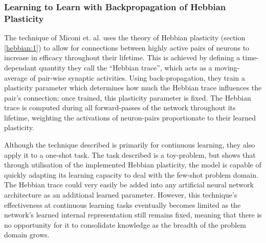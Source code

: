 \documentclass{report}
\begin{document}
	\subsubsection{Learning to Learn with Backpropagation of Hebbian Plasticity}
	The technique of Miconi et. al. \parencite{ltlwbohb} uses the theory of Hebbian plasticity (section \ref{hebbian:1}) to allow for connections between highly active pairs of neurons to increase in efficacy throughout their lifetime. This is achieved by defining a time-dependant quantity they call the ``Hebbian trace'', which acts as a moving-average of pair-wise synaptic activities. Using back-propagation, they train a plasticity parameter which determines how much the Hebbian trace influences the pair's connection; once trained, this plasticity parameter is fixed. The Hebbian trace is computed during all forward-passes of the network throughout its lifetime, weighting the activations of neuron-pairs proportionate to their learned plasticity. \par
	Although the technique described is primarily for continuous learning, they also apply it to a one-shot task. The task described is a toy-problem, but shows that through utilisation of the implemented Hebbian plasticity, the model is capable of quickly adapting its learning capacity to deal with the few-shot problem domain. The Hebbian trace could very easily be added into any artificial neural network architecture as an additional learned parameter. However, this technique's effectiveness at continuous learning tasks eventually becomes limited as the network's learned internal representation still remains fixed, meaning that there is no opportunity for it to consolidate knowledge as the breadth of the problem domain grows. \par
	
\end{document}

